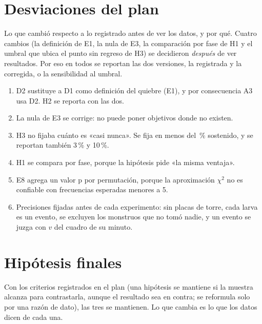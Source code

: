 \documentclass[11pt,letterpaper]{article}
\begin{document}
\section{Desviaciones del plan}

Lo que cambió respecto a lo registrado antes de ver los datos, y por qué. Cuatro cambios
(la definición de E1, la nula de E3, la comparación por fase de H1 y el umbral que
ubica el punto sin regreso de H3) se decidieron \emph{después} de ver resultados. Por
eso en todos se reportan las dos versiones, la registrada y la corregida, o la
sensibilidad al umbral.

\begin{enumerate}[leftmargin=1.6em,itemsep=.25em]
  \item D2 sustituye a D1 como definición del quiebre (E1), y por consecuencia A3 usa
        D2. H2 se reporta con las dos.
  \item La nula de E3 se corrige: no puede poner objetivos donde no existen.
  \item H3 no fijaba cuánto es «casi nunca». Se fija en menos del \hTresUmbral\,\%
        sostenido, y se reportan también 3\,\% y 10\,\%.
  \item H1 se compara por fase, porque la hipótesis pide «la misma ventaja».
  \item E8 agrega un valor p por permutación, porque la aproximación \(\chi^2\) no es
        confiable con frecuencias esperadas menores a 5.
  \item Precisiones fijadas antes de cada experimento: sin placas de torre, cada larva
        es un evento, se excluyen los monstruos que no tomó nadie, y un evento se juzga
        con \(v\) del cuadro de su minuto.
\end{enumerate}

\section{Hipótesis finales}

Con los criterios registrados en el plan (una hipótesis se mantiene si la muestra
alcanza para contrastarla, aunque el resultado sea en contra; se reformula solo por una
razón de dato), las tres se mantienen. Lo que cambia es lo que los datos dicen de cada
una.
\end{document}
